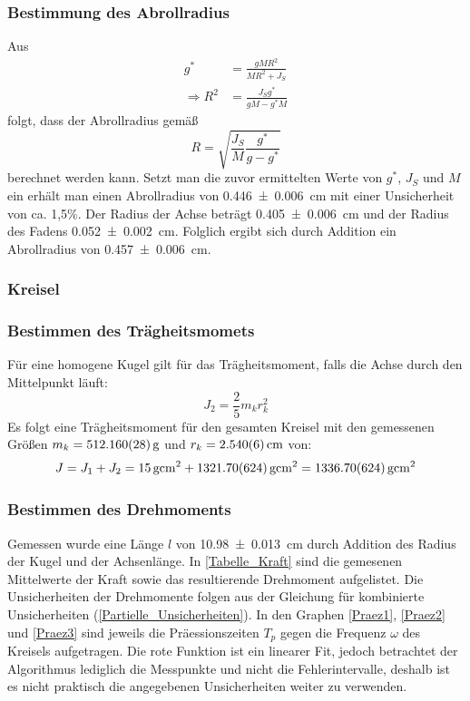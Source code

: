 \documentclass[
	a4paper,
	12pt,
	pagesize,
	ngerman
]{scrartcl}
\begin{document}
	\subsubsection*{Bestimmung des Abrollradius}
	Aus
	\begin{align}
		g^* &= \frac{gMR^2}{MR^2+J_S} \\
		\Rightarrow R^2 &= \frac{J_Sg^*}{gM-g^*M}
	\end{align}
	folgt, dass der Abrollradius gemäß 
	\begin{equation}
		R = \sqrt{\frac{J_S}{M}\frac{g^*}{g-g^*}}
	\end{equation}
	berechnet werden kann. 
	Setzt man die zuvor ermittelten Werte von $g^*$, $J_S$ und $M$ ein erhält man einen Abrollradius von \SI{0,446 \pm 0,006}{cm} mit einer Unsicherheit von ca. 1,5\%. %
	Der Radius der Achse beträgt \SI{0,405 \pm 0,006}{cm} und der Radius des Fadens \SI{0,052\pm 0,002}{cm}. 
	Folglich ergibt sich durch Addition ein Abrollradius von \SI{0,457 \pm 0,006}{cm}.

	\subsubsection{Kreisel}
	\subsubsection*{Bestimmen des Trägheitsmomets}
	Für eine homogene Kugel gilt für das Trägheitsmoment, falls die Achse durch den Mittelpunkt läuft:
	\begin{equation}
		\label{KugelTraegheitsmoment}
		J_2=\frac{2}{5}m_kr_k^2
	\end{equation}
	Es folgt eine Trägheitsmoment für den gesamten Kreisel mit den gemessenen Größen $m_k = \SI{512,16\pm 0,028}{g}$ und $r_k = \SI{2,54\pm 0,006}{cm}$ von:
	\begin{equation}
		J = J_1 + J_2 = \SI{15}{g cm^2} + \SI{1321,70\pm 6,24}{g cm^2} = \SI{1336,70 \pm 6,24}{g cm^2}
		\label{GesamtTraeg}
	\end{equation}
	\subsubsection*{Bestimmen des Drehmoments}
	Gemessen wurde eine Länge $l$ von \SI{10,98 \pm 0,013}{cm} durch Addition des Radius der Kugel und der Achsenlänge. 
	In \cref{Tabelle_Kraft} sind die gemesenen Mittelwerte der Kraft sowie das resultierende Drehmoment aufgelistet. 
	Die Unsicherheiten der Drehmomente folgen aus der Gleichung für kombinierte Unsicherheiten (\cref{Partielle_Unsicherheiten}). %
	In den Graphen \cref{Praez1}, \cref{Praez2} und \cref{Praez3} sind jeweils die Präessionszeiten $T_p$ gegen die Frequenz $\omega$ des Kreisels aufgetragen. Die rote Funktion ist ein linearer Fit, jedoch betrachtet der Algorithmus lediglich die Messpunkte und nicht die Fehlerintervalle, deshalb ist es nicht praktisch die angegebenen Unsicherheiten weiter zu verwenden. 
\end{document}
